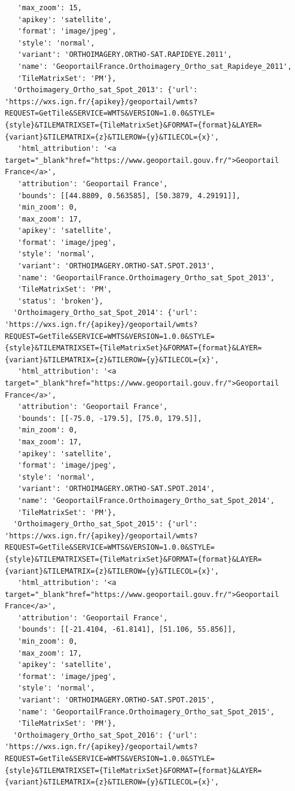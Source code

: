 \documentclass[
  letterpaper,
  DIV=11,
  numbers=noendperiod]{scrreprt}
\begin{document}
\begin{verbatim}
   'max_zoom': 15,
   'apikey': 'satellite',
   'format': 'image/jpeg',
   'style': 'normal',
   'variant': 'ORTHOIMAGERY.ORTHO-SAT.RAPIDEYE.2011',
   'name': 'GeoportailFrance.Orthoimagery_Ortho_sat_Rapideye_2011',
   'TileMatrixSet': 'PM'},
  'Orthoimagery_Ortho_sat_Spot_2013': {'url': 'https://wxs.ign.fr/{apikey}/geoportail/wmts?REQUEST=GetTile&SERVICE=WMTS&VERSION=1.0.0&STYLE={style}&TILEMATRIXSET={TileMatrixSet}&FORMAT={format}&LAYER={variant}&TILEMATRIX={z}&TILEROW={y}&TILECOL={x}',
   'html_attribution': '<a target="_blank"href="https://www.geoportail.gouv.fr/">Geoportail France</a>',
   'attribution': 'Geoportail France',
   'bounds': [[44.8809, 0.563585], [50.3879, 4.29191]],
   'min_zoom': 0,
   'max_zoom': 17,
   'apikey': 'satellite',
   'format': 'image/jpeg',
   'style': 'normal',
   'variant': 'ORTHOIMAGERY.ORTHO-SAT.SPOT.2013',
   'name': 'GeoportailFrance.Orthoimagery_Ortho_sat_Spot_2013',
   'TileMatrixSet': 'PM',
   'status': 'broken'},
  'Orthoimagery_Ortho_sat_Spot_2014': {'url': 'https://wxs.ign.fr/{apikey}/geoportail/wmts?REQUEST=GetTile&SERVICE=WMTS&VERSION=1.0.0&STYLE={style}&TILEMATRIXSET={TileMatrixSet}&FORMAT={format}&LAYER={variant}&TILEMATRIX={z}&TILEROW={y}&TILECOL={x}',
   'html_attribution': '<a target="_blank"href="https://www.geoportail.gouv.fr/">Geoportail France</a>',
   'attribution': 'Geoportail France',
   'bounds': [[-75.0, -179.5], [75.0, 179.5]],
   'min_zoom': 0,
   'max_zoom': 17,
   'apikey': 'satellite',
   'format': 'image/jpeg',
   'style': 'normal',
   'variant': 'ORTHOIMAGERY.ORTHO-SAT.SPOT.2014',
   'name': 'GeoportailFrance.Orthoimagery_Ortho_sat_Spot_2014',
   'TileMatrixSet': 'PM'},
  'Orthoimagery_Ortho_sat_Spot_2015': {'url': 'https://wxs.ign.fr/{apikey}/geoportail/wmts?REQUEST=GetTile&SERVICE=WMTS&VERSION=1.0.0&STYLE={style}&TILEMATRIXSET={TileMatrixSet}&FORMAT={format}&LAYER={variant}&TILEMATRIX={z}&TILEROW={y}&TILECOL={x}',
   'html_attribution': '<a target="_blank"href="https://www.geoportail.gouv.fr/">Geoportail France</a>',
   'attribution': 'Geoportail France',
   'bounds': [[-21.4104, -61.8141], [51.106, 55.856]],
   'min_zoom': 0,
   'max_zoom': 17,
   'apikey': 'satellite',
   'format': 'image/jpeg',
   'style': 'normal',
   'variant': 'ORTHOIMAGERY.ORTHO-SAT.SPOT.2015',
   'name': 'GeoportailFrance.Orthoimagery_Ortho_sat_Spot_2015',
   'TileMatrixSet': 'PM'},
  'Orthoimagery_Ortho_sat_Spot_2016': {'url': 'https://wxs.ign.fr/{apikey}/geoportail/wmts?REQUEST=GetTile&SERVICE=WMTS&VERSION=1.0.0&STYLE={style}&TILEMATRIXSET={TileMatrixSet}&FORMAT={format}&LAYER={variant}&TILEMATRIX={z}&TILEROW={y}&TILECOL={x}',

\end{verbatim}
\end{document}

